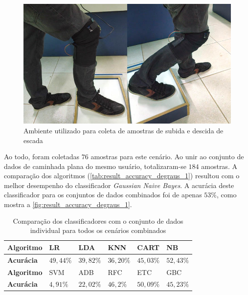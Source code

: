 \begin{figure}[ht]
	\caption{\label{fig:result_poses_degraus}Ambiente utilizado para coleta de amostras de subida e descida de escada}
	\begin{center}
		\includegraphics[width=.8\textwidth]{resources/result_poses_degraus}
	\end{center}
\end{figure}

Ao todo, foram coletadas \(76\) amostras para este cenário. Ao unir ao conjunto de dados de caminhada plana do mesmo usuário, totalizaram-se \(184\) amostras. A comparação dos algoritmos (\autoref{tab:result_accuracy_degraus_1}) resultou com o melhor desempenho do classificador \textit{Gaussian Naive Bayes}. A acurácia deste classificador para os conjuntos de dados combinados foi de apenas \(53\%\), como mostra a \autoref{fig:result_accuracy_degraus_1}.


\begin{table}[ht]
	\caption{Comparação dos classificadores com o conjunto de dados individual para todos os cenários combinados}%
	\label{tab:result_accuracy_degraus_1}
	\begin{tabularx}{\textwidth}{X X X X X X}
		\toprule
		\textbf{Algoritmo} & LR            & LDA           & KNN           & CART          & NB            \\ \midrule
		\textbf{Acurácia}  & \(49{,}44\%\) & \(39{,}82\%\) & \(36{,}20\%\) & \(45{,}03\%\) & \(52{,}43\%\) \\ \bottomrule \toprule
		\textbf{Algoritmo} & SVM           & ADB           & RFC           & ETC           & GBC           \\ \midrule
		\textbf{Acurácia}  & \(4{,}91\%\)  & \(22{,}02\%\) & \(46{,}2\%\)  & \(50{,}09\%\) & \(45{,}23\%\) \\ \bottomrule
	\end{tabularx}
\end{table}


